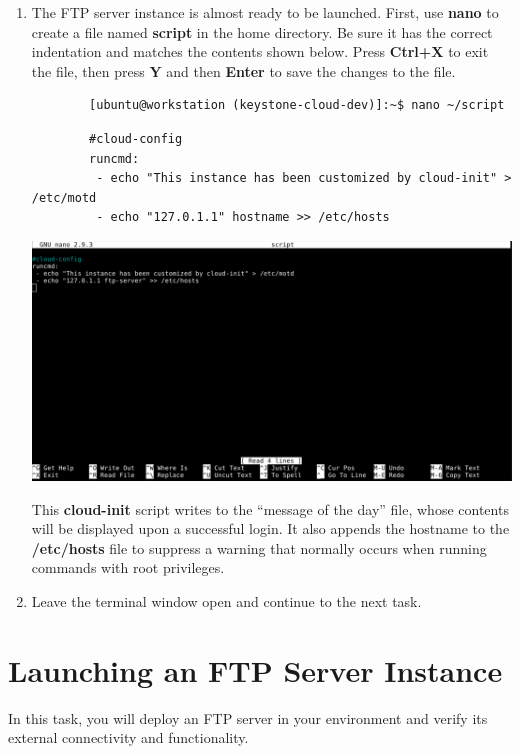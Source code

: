 \documentclass[letterpaper, 12pt]{article}
\begin{document}
\begin{enumerate}
    \item The FTP server instance is almost ready to be launched. First, use \textbf{nano} to create a file named
    \textbf{script} in the home directory. Be sure it has the correct indentation and matches the contents shown below.
    Press \textbf{Ctrl+X} to exit the file, then press \textbf{Y} and then \textbf{Enter} to save the changes to the
    file.
    \begin{lstlisting}
        [ubuntu@workstation (keystone-cloud-dev)]:~$ nano ~/script
    \end{lstlisting}
    \begin{lstlisting}
        #cloud-config
        runcmd:
         - echo "This instance has been customized by cloud-init" > /etc/motd
         - echo "127.0.1.1" hostname >> /etc/hosts
    \end{lstlisting}

    \begin{center}
        \includegraphics[width=\linewidth]{images/part1/step37.png}
    \end{center}

    \begin{notebox}
        This \textbf{cloud-init} script writes to the ``message of the day'' file, whose contents will be displayed
        upon a successful login. It also appends the hostname to the \textbf{/etc/hosts} file to suppress a warning that
        normally occurs when running commands with root privileges.
    \end{notebox}

    \item Leave the terminal window open and continue to the next task.
\end{enumerate}

\section{Launching an FTP Server Instance}
\label{sec:launch_an_ftp_server_instance}
In this task, you will deploy an FTP server in your environment and verify its external connectivity and functionality.
\end{document}
